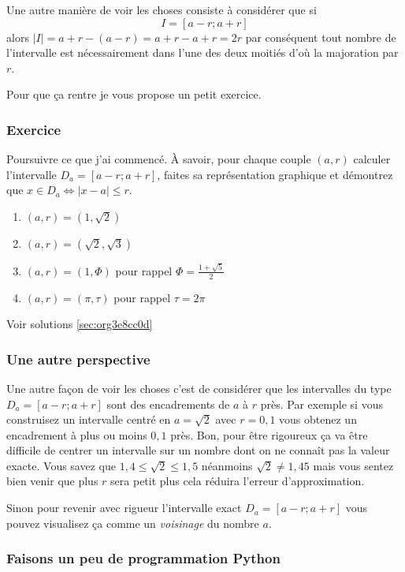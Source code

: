 \documentclass[a4paper, 11pt, twoside]{article}
\begin{document}
Une autre manière de voir les choses consiste à considérer que si
\[I = [a - r ; a + r]\] alors \(|I| = a + r - (a - r) = a + r - a +
   r = 2r\) par conséquent tout nombre de l'intervalle est
nécessairement dans l'une des deux moitiés d'où la majoration par
\(r\).

Pour que ça rentre je vous propose un petit exercice.

\subsubsection{Exercice}
\label{sec:orga80e08b}
Poursuivre ce que j'ai commencé. À savoir, pour chaque couple \((a,
    r)\) calculer l'intervalle \(D_a = [a - r ; a + r]\), faites sa
représentation graphique et démontrez que \(x\in D_a \iff \lvert
    x - a \rvert \leq r\).

\begin{enumerate}
\item \((a, r) = (1, \sqrt{2})\)
\item \((a, r) = (\sqrt{2}, \sqrt{3})\)
\item \((a, r) = (1, \Phi)\) pour rappel \(\Phi = \frac{1 +
       \sqrt{5}}{2}\)
\item \((a, r) = (\pi, \tau)\) pour rappel \(\tau = 2\pi\)
\end{enumerate}


Voir solutions \ref{sec:org3e8cc0d}

\subsubsection{Une autre perspective}
\label{sec:org22b4f78}

Une autre façon de voir les choses c'est de considérer que les
intervalles du type \(D_a = [a - r ; a + r]\) sont des encadrements
de \(a\) à \(r\) près. Par exemple si vous construisez un intervalle
centré en \(a = \sqrt{2}\) avec \(r = 0,1\) vous obtenez un
encadrement à plus ou moins \(0,1\) près. Bon, pour être rigoureux
ça va être difficile de centrer un intervalle sur un nombre dont
on ne connaît pas la valeur exacte. Vous savez que \(1,4 \leq
    \sqrt{2} \leq 1,5\) néanmoins \(\sqrt{2} \neq 1,45\) mais vous sentez
bien venir que plus \(r\) sera petit plus cela réduira l'erreur
d'approximation.

Sinon pour revenir avec rigueur l'intervalle exact \(D_a = [a - r ;
    a + r]\) vous pouvez visualisez ça comme un \emph{voisinage} du nombre
\(a\).

\subsubsection{Faisons un peu de programmation Python}
\label{sec:org45b26c2}
\end{document}
